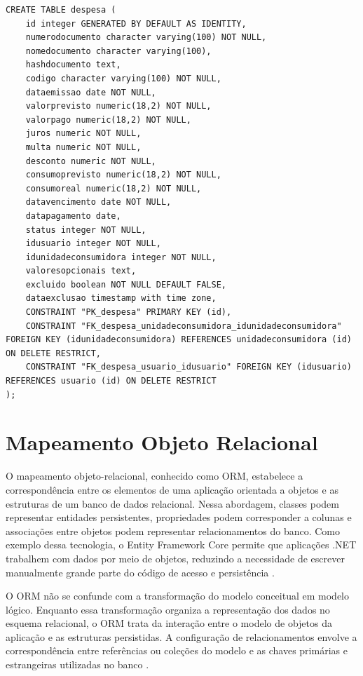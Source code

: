 \begin{quadro}[H]
\caption{Script SQL — Tabela despesa}
\label{qua:script-despesa}
\begin{minipage}{0.96\textwidth}
\begin{lstlisting}[style=academic-sql]
CREATE TABLE despesa (
    id integer GENERATED BY DEFAULT AS IDENTITY,
    numerodocumento character varying(100) NOT NULL,
    nomedocumento character varying(100),
    hashdocumento text,
    codigo character varying(100) NOT NULL,
    dataemissao date NOT NULL,
    valorprevisto numeric(18,2) NOT NULL,
    valorpago numeric(18,2) NOT NULL,
    juros numeric NOT NULL,
    multa numeric NOT NULL,
    desconto numeric NOT NULL,
    consumoprevisto numeric(18,2) NOT NULL,
    consumoreal numeric(18,2) NOT NULL,
    datavencimento date NOT NULL,
    datapagamento date,
    status integer NOT NULL,
    idusuario integer NOT NULL,
    idunidadeconsumidora integer NOT NULL,
    valoresopcionais text,
    excluido boolean NOT NULL DEFAULT FALSE,
    dataexclusao timestamp with time zone,
    CONSTRAINT "PK_despesa" PRIMARY KEY (id),
    CONSTRAINT "FK_despesa_unidadeconsumidora_idunidadeconsumidora" FOREIGN KEY (idunidadeconsumidora) REFERENCES unidadeconsumidora (id) ON DELETE RESTRICT,
    CONSTRAINT "FK_despesa_usuario_idusuario" FOREIGN KEY (idusuario) REFERENCES usuario (id) ON DELETE RESTRICT
);
\end{lstlisting}
\end{minipage}
\end{quadro}

\section{Mapeamento Objeto Relacional}

O mapeamento objeto-relacional, conhecido como ORM, estabelece a correspondência entre os elementos de uma aplicação orientada a objetos e as estruturas de um banco de dados relacional. Nessa abordagem, classes podem representar entidades persistentes, propriedades podem corresponder a colunas e associações entre objetos podem representar relacionamentos do banco. Como exemplo dessa tecnologia, o Entity Framework Core permite que aplicações .NET trabalhem com dados por meio de objetos, reduzindo a necessidade de escrever manualmente grande parte do código de acesso e persistência \parencite{MicrosoftEFCore2024}.

O ORM não se confunde com a transformação do modelo conceitual em modelo lógico. Enquanto essa transformação organiza a representação dos dados no esquema relacional, o ORM trata da interação entre o modelo de objetos da aplicação e as estruturas persistidas. A configuração de relacionamentos envolve a correspondência entre referências ou coleções do modelo e as chaves primárias e estrangeiras utilizadas no banco \parencite{MicrosoftRelationships2023}.

